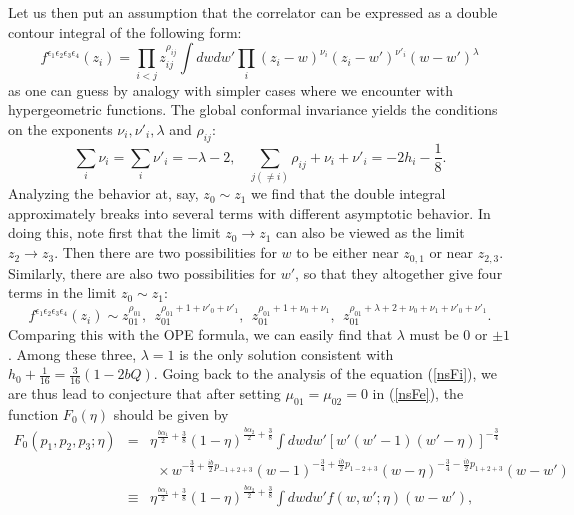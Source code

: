 \documentclass[a4paper,12pt]{article}
\newcommand{\ep}{{\epsilon}}
\begin{document}
   Let us then put an assumption that the correlator can be expressed
 as a double contour integral of the following form:
\begin{equation}
   f^{\ep_1\ep_2\ep_3\ep_4}(z_i)=
  \prod_{i<j}z_{ij}^{\rho_{ij}}
  \int dwdw'\prod_i(z_i-w)^{\nu_i}(z_i-w')^{\nu'_i}(w-w')^\lambda
\end{equation}
 as one can guess by analogy with simpler cases where
 we encounter with hypergeometric functions.
 The global conformal invariance yields the conditions on
 the exponents $\nu_i,\nu'_i,\lambda$ and $\rho_{ij}$:
\begin{equation}
  \sum_i\nu_i=\sum_i\nu'_i=-\lambda-2,~~~~
 \sum_{j(\ne i)}\rho_{ij}+\nu_i+\nu'_i=-2h_i-\frac{1}{8}.
\end{equation}
 Analyzing the behavior at, say, $z_0\sim z_1$ we find that
 the double integral approximately breaks into several terms
 with different asymptotic behavior.
 In doing this, note first that the limit $z_0\rightarrow z_1$
 can also be viewed as the limit $z_2\rightarrow z_3$.
 Then there are two possibilities for $w$ to be
 either near $z_{0,1}$ or near $z_{2,3}$.
 Similarly, there are also two possibilities for $w'$,
 so that they altogether give four terms in the limit $z_0\sim z_1$:
\begin{equation}
 f^{\ep_1\ep_2\ep_3\ep_4}(z_i)\sim
 z_{01}^{\rho_{01}},~~
 z_{01}^{\rho_{01}+1+\nu'_0+\nu'_1},~~
 z_{01}^{\rho_{01}+1+\nu_0+\nu_1},~~
 z_{01}^{\rho_{01}+\lambda+2+\nu_0+\nu_1+\nu'_0+\nu'_1}.
\end{equation}
 Comparing this with the OPE formula, we can easily find that
 $\lambda$ must be $0$ or $\pm1$.
 Among these three, $\lambda=1$ is the only solution consistent
 with $h_0+\frac{1}{16}=\frac{3}{16}(1-2bQ)$.
 Going back to the analysis of the equation (\ref{nsFi}),
 we are thus lead to conjecture that after setting
 $\mu_{01}=\mu_{02}=0$ in (\ref{nsFe}),
 the function $F_0(\eta)$ should be given by
\begin{eqnarray}
  F_0(p_1,p_2,p_3;\eta) &=&
  \eta^{\frac{b\alpha_1}{2}+\frac{3}{8}}
  (1-\eta)^{\frac{b\alpha_2}{2}+\frac{3}{8}}
  \int dwdw'
  \left[w'(w'-1)(w'-\eta)\right]^{-\frac{3}{4}}
  \nonumber \\ && ~~\times
  w^{-\frac{3}{4}+\frac{ib}{2}p_{-1+2+3}}
  (w-1)^{-\frac{3}{4}+\frac{ib}{2}p_{1-2+3}}
  (w-\eta)^{-\frac{3}{4}-\frac{ib}{2}p_{1+2+3}}
  (w-w') \nonumber\\
  &\equiv&
  \eta^{\frac{b\alpha_1}{2}+\frac{3}{8}}
  (1-\eta)^{\frac{b\alpha_2}{2}+\frac{3}{8}}
  \int dwdw'f(w,w';\eta)(w-w'),
\end{eqnarray}
\end{document}
